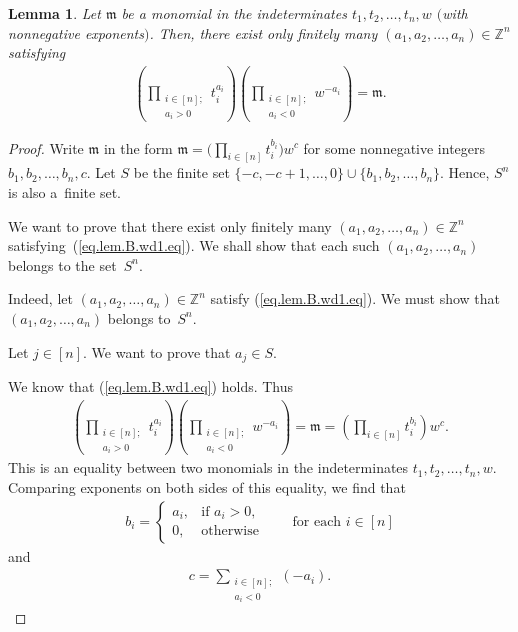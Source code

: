 \documentclass[11pt]{article}
\newtheorem{Lemma}[Theorem]{Lemma}
\numberwithin{equation}{section}
\let\sumnonlimits\sum
\let\prodnonlimits\prod
\renewcommand{\sum}{\sumnonlimits\limits}
\renewcommand{\prod}{\prodnonlimits\limits}
\begin{document}
\begin{Lemma}\label{lem.B.wd1}Let $\mathfrak{m}$ be a monomial in the indeterminates $t_{1},t_{2},\ldots,t_{n},w$ $($with nonnegative exponents$)$. Then, there exist only finitely many $( a_{1},a_{2},\ldots,a_{n}) \in\mathbb{Z}^{n}$ satisfying
\begin{gather}
\left( \prod_{\substack{i\in[n] ;\\a_{i}>0}}t_{i}^{a_{i}}\right) \left( \prod_{\substack{i\in[n] ;\\a_{i}<0}}w^{-a_{i}}\right) =\mathfrak{m}. \label{eq.lem.B.wd1.eq}
\end{gather}
\end{Lemma}

\begin{proof} Write $\mathfrak{m}$ in the form $\mathfrak{m}=\Big( \prod_{i\in[n] }t_{i}^{b_{i}}\Big) w^{c}$ for some nonnegative integers $b_{1},b_{2},\ldots,b_{n},c$. Let $S$ be the finite set $ \{ -c,-c+1,\ldots,0 \} \cup \{ b_{1} ,b_{2},\ldots,b_{n} \} $. Hence, $S^{n}$ is also a~finite set.

We want to prove that there exist only finitely many $ ( a_{1},a_{2},\ldots,a_{n} ) \in\mathbb{Z}^{n}$ satisfying~(\ref{eq.lem.B.wd1.eq}). We shall show that each such $ ( a_{1},a_{2},\ldots,a_{n} ) $ belongs to the set~$S^{n}$.

Indeed, let $ ( a_{1},a_{2},\ldots,a_{n} ) \in\mathbb{Z}^{n}$ satisfy (\ref{eq.lem.B.wd1.eq}). We must show that $ ( a_{1},a_{2},\ldots,a_{n} ) $ belongs to~$S^{n}$.

Let $j\in[n] $. We want to prove that $a_{j}\in S$.

We know that (\ref{eq.lem.B.wd1.eq}) holds. Thus
\begin{gather*}
\left( \prod_{\substack{i\in[n] ;\\a_{i}>0}}t_{i}^{a_{i}}\right) \left( \prod_{\substack{i\in[n] ;\\a_{i}<0}}w^{-a_{i}}\right) =\mathfrak{m}=\left( \prod_{i\in[n] }t_{i}^{b_{i}}\right) w^{c}.
\end{gather*}
This is an equality between two monomials in the indeterminates $t_{1},t_{2},\ldots,t_{n},w$. Comparing exponents on both sides of this equality, we find that
\begin{gather}
b_{i}=
\begin{cases}
a_{i}, & \text{if }a_{i}>0,\\
0, & \text{otherwise}
\end{cases}
\qquad \text{for each }i\in[n] \label{pf.lem.B.wd1.bi=}
\end{gather}
and
\begin{gather}
c=\sum_{\substack{i\in[n] ;\\a_{i}<0}} ( -a_{i} ) .\label{pf.lem.B.wd1.c=}
\end{gather}


\end{proof}
\end{document}
